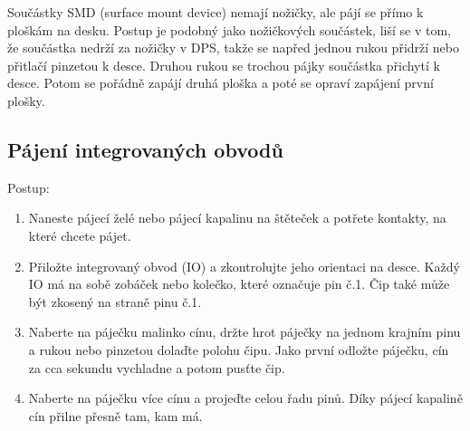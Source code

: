 Součástky SMD (surface mount device) nemají nožičky, ale pájí se přímo k ploškám na desku. 
Postup je podobný jako nožičkových součástek, liší se v tom, že součástka nedrží za nožičky v DPS, 
takže se napřed jednou rukou přidrží nebo přitlačí pinzetou k desce. Druhou rukou se trochou 
pájky součástka přichytí k desce. Potom se pořádně zapájí druhá ploška a poté se opraví zapájení první plošky.   

\subsection{Pájení integrovaných obvodů} 

Postup: 
\begin{enumerate}


\item Naneste pájecí želé  nebo pájecí kapalinu na štěteček a potřete kontakty, na které chcete pájet.     
\item Přiložte integrovaný obvod (IO) a zkontrolujte jeho orientaci na desce. Každý IO 
má na sobě zobáček nebo kolečko, které označuje pin č.1. Čip také může být zkosený na straně pinu č.1.
\item Naberte na páječku malinko cínu, držte hrot páječky na jednom krajním pinu a rukou nebo 
pinzetou dolaďte polohu čipu. Jako první odložte páječku, cín za cca sekundu vychladne a potom pusťte čip.  
\item Naberte na páječku více cínu a projeďte celou řadu pinů. Díky pájecí kapalině cín přilne přesně tam, kam má.  

\end{enumerate}
                                                                                                    
